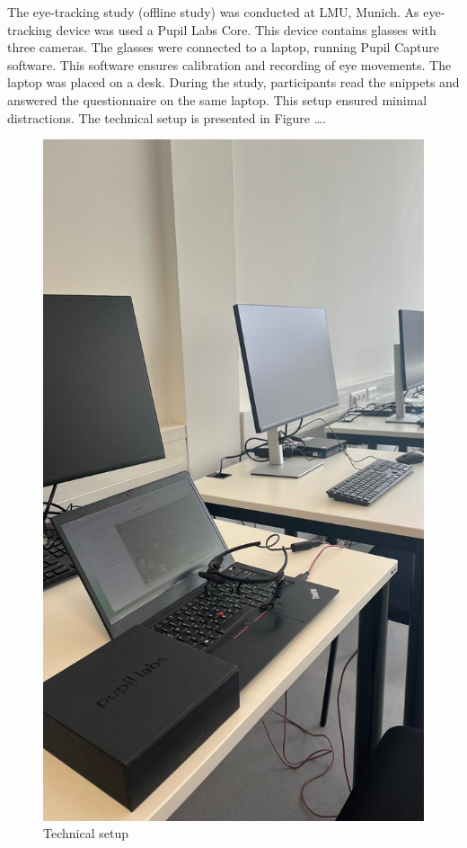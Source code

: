 The eye-tracking study (offline study) was conducted at LMU, Munich. As eye-tracking device was used a Pupil Labs Core. This device contains glasses with three cameras. The glasses were connected to a laptop, running Pupil Capture software. This software ensures calibration and recording of eye movements. The laptop was placed on a desk. During the study, participants read the snippets and answered the questionnaire on the same laptop. This setup ensured minimal distractions.  The technical setup is presented in Figure ….

\begin{figure} [H]
  \centering
  \includegraphics[scale=0.25]{figures/setup.png}
  \caption{Technical setup }
  \label{fig:AnhangsChor}
\end{figure}



